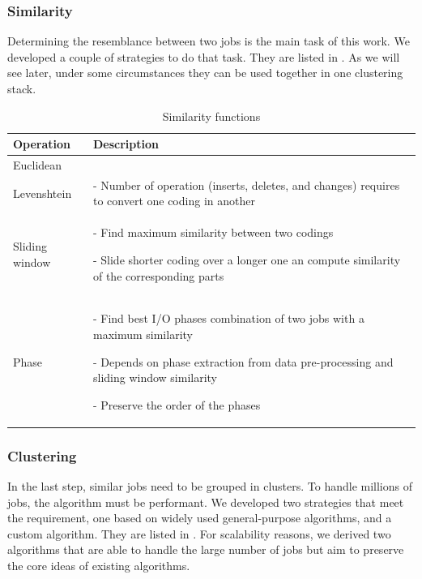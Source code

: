 \documentclass[]{llncs}
\begin{document}
\subsubsection{Similarity}
Determining the resemblance between two jobs is the main task of this work.
We developed a couple of strategies to do that task.
They are listed in .
As we will see later, under some circumstances they can be used together in one clustering stack.

\begin{table}
  \centering
  \begin{tabularx}{\textwidth}{lX}
    Operation & Description \\
    \hline
    Euclidean & \\
    \hline
    Levenshtein &  - Number of operation (inserts, deletes, and changes) requires to convert one coding in another \\
    \hline
    Sliding window &  - Find maximum similarity between two codings \par - Slide shorter coding over a longer one an compute similarity of the corresponding parts \\
    \hline
    Phase &  - Find best I/O phases combination of two jobs with a maximum similarity \par - Depends on phase extraction from data pre-processing and sliding window similarity \par - Preserve the order of the phases \\
    \hline
  \end{tabularx}
  \caption{Similarity functions}
  \label{tab:sim_funcs}
\end{table}

\subsubsection{Clustering}
In the last step, similar jobs need to be grouped in clusters.
To handle millions of jobs, the algorithm must be performant.
We developed two strategies that meet the requirement, one based on widely used general-purpose algorithms, and a custom algorithm.
They are listed in .
For scalability reasons, we derived two algorithms that are able to handle the large number of jobs but aim to preserve the core ideas of existing algorithms.
\end{document}

